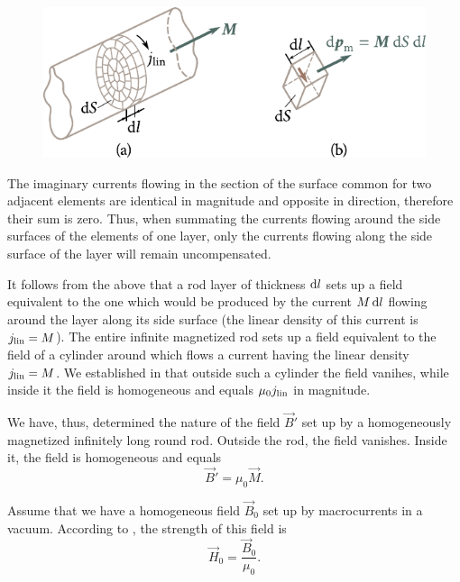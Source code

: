 \begin{figure}[t]
	\begin{center}
		\includegraphics[scale=1]{figures/ch_07/fig_7_4.pdf}
		\caption[]{}
		\label{fig:7_4}
	\end{center}
	\vspace{-0.8cm}
\end{figure}

The imaginary currents flowing in the section of the surface common for two adjacent elements are identical in magnitude and opposite in direction, therefore their sum is zero. Thus, when summating the currents flowing around the side surfaces of the elements of one layer, only the currents flowing along the side surface of the layer will remain uncompensated.

It follows from the above that a rod layer of thickness $\mathrm{d} l$ sets up a field equivalent to the one which would be produced by the current $M\,\mathrm{d} l$ flowing around the layer along its side surface (the linear density of this current is $j_{\text{lin}}=M$).
The entire infinite magnetized rod sets up a field equivalent to the field of a cylinder around which flows a current having the linear density $j_{\text{lin}}=M$. We established in  that outside such a cylinder the field vanihes, while inside it the field is homogeneous and equals $\mu_0j_{\text{lin}}$ in magnitude.

We have, thus, determined the nature of the field $\vec{B}'$ set up by a homogeneously magnetized infinitely long round rod.
Outside the rod, the field vanishes.
Inside it, the field is homogeneous and equals
\begin{equation}\label{eq:7_23}
    \vec{B}' = \mu_0 \vec{M}.
\end{equation}

Assume that we have a homogeneous field $\vec{B}_0$ set up by macrocurrents in a vacuum.
According to , the strength of this field is
\begin{equation}\label{eq:7_24}
    \vec{H}_0 = \frac{\vec{B}_0}{\mu_0}.
\end{equation}

